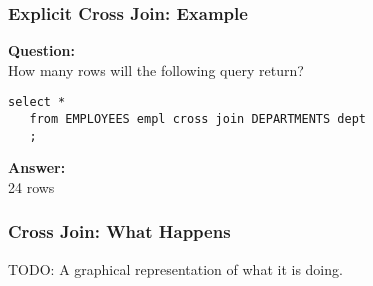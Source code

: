 \documentclass{beamer}
\begin{document}
\begin{frame}[fragile] %
  \frametitle{Explicit Cross Join: Example}

  \textbf{Question:}\\ How many rows will the following query return?
  \bigskip

  \begin{lstlisting}[title={\tiny Source: https://github.com/Choens/sql-survival-guide/blob/master/sql/04-joins/cross-joins.sql}]
   select *
   from EMPLOYEES empl cross join DEPARTMENTS dept
   ;
  \end{lstlisting}
  
  \bigskip
  \pause 
  \textbf{Answer:}\\ 24 rows
  
\end{frame}

\begin{frame}
  \frametitle{Cross Join: What Happens}
  TODO: A graphical representation of what it is doing.
\end{frame}
\end{document}
